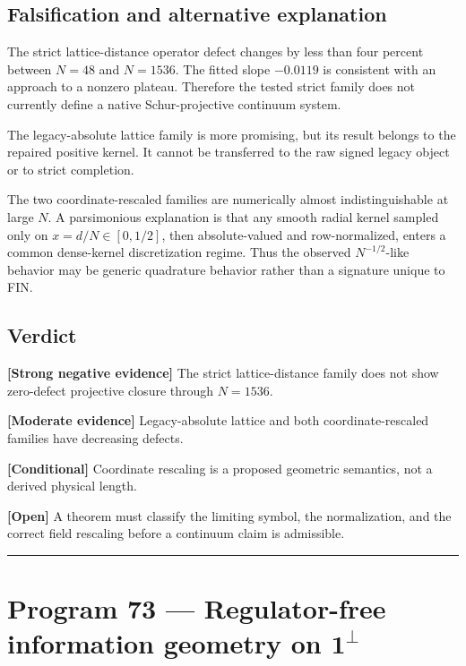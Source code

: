 \documentclass[11pt,a4paper,openany]{report}
\newcommand{\statusModerate}{\textcolor{finviolet}{[Moderate evidence]}}
\newcommand{\statusConditional}{\textcolor{finorange}{[Conditional]}}
\newcommand{\statusOpen}{\textcolor{finviolet}{[Open]}}
\begin{document}
\section{Falsification and alternative explanation}

The strict lattice-distance operator defect changes by less than four percent between \(N=48\) and \(N=1536\). The fitted slope \(-0.0119\) is consistent with an approach to a nonzero plateau. Therefore the tested strict family does not currently define a native Schur-projective continuum system.

The legacy-absolute lattice family is more promising, but its result belongs to the repaired positive kernel. It cannot be transferred to the raw signed legacy object or to strict completion.

The two coordinate-rescaled families are numerically almost indistinguishable at large \(N\). A parsimonious explanation is that any smooth radial kernel sampled only on \(x=d/N\in[0,1/2]\), then absolute-valued and row-normalized, enters a common dense-kernel discretization regime. Thus the observed \(N^{-1/2}\)-like behavior may be generic quadrature behavior rather than a signature unique to FIN.

\section{Verdict}

\textbf{[Strong negative evidence]} The strict lattice-distance family does not show zero-defect projective closure through \(N=1536\).

\textbf{\statusModerate{}} Legacy-absolute lattice and both coordinate-rescaled families have decreasing defects.

\textbf{\statusConditional{}} Coordinate rescaling is a proposed geometric semantics, not a derived physical length.

\textbf{\statusOpen{}} A theorem must classify the limiting symbol, the normalization, and the correct field rescaling before a continuum claim is admissible.

\par\medskip\hrule\medskip

\chapter{\texorpdfstring{Program 73 --- Regulator-free information geometry on \(\mathbf1^\perp\)}{Program 73 --- Regulator-free information geometry on 1\textasciicircum{}}}
\end{document}
